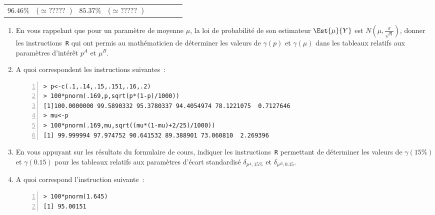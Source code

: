 \documentclass[10pt]{report}
\begin{document}
\begin{exercice}
\begin{center}
\begin{tabular}{|c|rl|rl|rl|rl|}
        $96.46\%$
         & 
    
        ($\simeq \mbox{ ????? }$)
         & 
    
        $85.37\%$
         & 
    
        ($\simeq \mbox{ ????? }$)
        
    \\ \cline{1-9}

    \end{tabular}

\end{center}

\begin{enumerate}
\item En vous rappelant que pour un paramètre de moyenne $\mu$, la loi de probabilité de son estimateur $\Est{\mu}{Y}$ est $N(\mu,\frac{\sigma}{\sqrt{n}})$, donner les instructions~\texttt{R} qui ont permis au mathématicien de déterminer les valeurs de $\gamma(p)$ et $\gamma(\mu)$ dans les tableaux relatifs aux paramètres d'intérêt $p^A$ et $\mu^B$.
\item A quoi correspondent les instructions suivantes~:
\begin{Verbatim}[frame=leftline,fontfamily=tt,fontshape=n,numbers=left]
> p<-c(.1,.14,.15,.151,.16,.2)
> 100*pnorm(.169,p,sqrt(p*(1-p)/1000))
[1]100.0000000 99.5890332 95.3780337 94.4054974 78.1221075  0.7127646
> mu<-p
> 100*pnorm(.169,mu,sqrt((mu*(1-mu)+2/25)/1000))
[1] 99.999994 97.974752 90.641532 89.388901 73.060810  2.269396
\end{Verbatim}

\item En vous appuyant sur les résultats du formulaire de cours, indiquer les instructions~\texttt{R} permettant de déterminer les valeurs de $\gamma(15\%)$ et $\gamma(0.15)$ pour les tableaux relatifs aux paramètres d'écart standardisé $\delta_{p^A,15\%}$ et $\delta_{\mu^B,0.15}$.
\item A quoi correspond l'instruction suivante~:
\begin{Verbatim}[frame=leftline,fontfamily=tt,fontshape=n,numbers=left]
> 100*pnorm(1.645)
[1] 95.00151
\end{Verbatim}

\end{enumerate}
\end{exercice}
\end{document}
